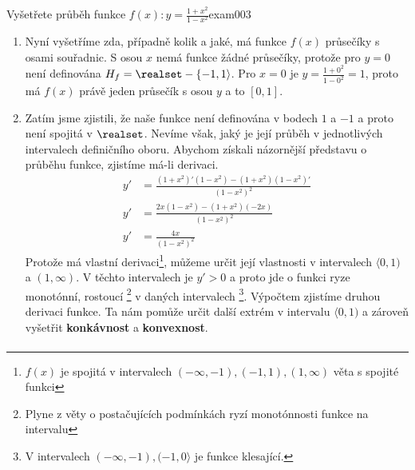 \begin{mathexam}{Vyšetřete průběh funkce \(f(x):y=\frac{1+x^2}{1-x^2}\)}{exam003}
\begin{enumerate}[noitemsep]
        $$\lim_{x\to1_{-}}\frac{1+x^2}{1-x^2}=+\infty.$$ Obdobně dojdeme k
        $$\lim_{x\to1_+}\frac{1+x^2}{1-x^2}=-\infty.$$ A konečně v nevlastních bodech $±\infty$ je
        limita $$\lim_{x\to±\infty}\frac{1+x^2}{1-x^2} = \lim_{x\to\pm\infty}\frac{1}{1-x^2} +
        \lim_{x\to\pm\infty}\frac{x^2}{1-x^2}=0-1=-1.$$ Výpočtem limit jsme zároveň určili dva
        absolutní (globální) extrémy a jeden lokální:
        \begin{itemize}
          \item v intervalu $(-1,1)$ má funkce maximum $\infty$ a minimum $1$,
          \item v intervalech $(-1,1)\cup(1,+\infty)$ má funkce minimum $-\infty$ a maximum $-1$.
        \end{itemize}
    \item Nyní vyšetříme zda, případně kolik a jaké, má funkce $f(x)$ průsečíky s osami souřadnic. S
        osou $x$ nemá funkce žádné průsečíky, protože pro $y=0$ není definována
        $H_f=\realset-\{-1,1\rangle$. Pro $x=0$ je $y=\frac{1+0^2}{1-0^2}=1$, proto má $f(x)$ právě
        jeden průsečík s osou $y$ a to $[0,1]$.
    \item Zatím jsme zjistili, že naše funkce není definována v bodech $1$ a $-1$ a proto není
        spojitá v  $\realset$. Nevíme však, jaký je její průběh v jednotlivých intervalech
        definičního oboru.  Abychom získali názornější představu o průběhu funkce, zjistíme má-li
        derivaci.
        \begin{align*}
          y' &= \frac{(1+x^2)'(1-x^2 )-(1+x^2)(1-x^2 )'}{(1-x^2)^2} \\
          y' &= \frac{2x(1-x^2 )-(1+x^2 )(-2x)}{(1-x^2 )^2}         \\
          y' &= \frac{4x}{(1-x^2 )^2}
        \end{align*}
        Protože má vlastní derivaci\footnote{$f(x)$ je spojitá v intervalech $(-\infty,-1),
        (-1,1),(1,\infty)$  věta s spojité funkci}, můžeme určit její vlastnosti v intervalech
        $\langle0,1)$ a $(1,\infty)$. V těchto intervalech je $y'>0$ a proto jde o funkci ryze
        monotónní, rostoucí \footnote{Plyne z věty o postačujících podmínkách ryzí monotónnosti
        funkce na intervalu} v daných intervalech \footnote{V intervalech
        $(-\infty,-1),(-1,0\rangle$ je funkce klesající.}. Výpočtem zjistíme druhou derivaci funkce.
        Ta nám pomůže určit další extrém v intervalu $\langle0,1)$ a zároveň vyšetřit
        \textbf{konkávnost} a \textbf{konvexnost}.
        \begin{align*}

\end{align*}
\end{enumerate}
\end{mathexam}
